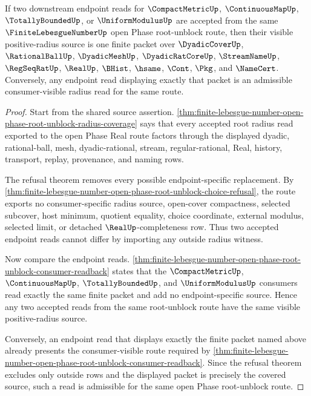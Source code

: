 \begin{theorem}
\label{thm:finite-lebesgue-number-root-unblock-endpoint-uniformity}
If two downstream endpoint reads for $\CompactMetricUp$, $\ContinuousMapUp$, $\TotallyBoundedUp$, or $\UniformModulusUp$ are accepted from the same $\FiniteLebesgueNumberUp$ open Phase root-unblock route, then their visible positive-radius source is one finite packet over $\DyadicCoverUp$, $\RationalBallUp$, $\DyadicMeshUp$, $\DyadicRatCoreUp$, $\StreamNameUp$, $\RegSeqRatUp$, $\RealUp$, $\BHist$, $\hsame$, $\Cont$, $\Pkg$, and $\NameCert$. Conversely, any endpoint read displaying exactly that packet is an admissible consumer-visible radius read for the same route.
\end{theorem}
\begin{proof}
Start from the shared source assertion. \autoref{thm:finite-lebesgue-number-open-phase-root-unblock-radius-coverage} says that every accepted root radius read exported to the open Phase Real route factors through the displayed dyadic, rational-ball, mesh, dyadic-rational, stream, regular-rational, Real, history, transport, replay, provenance, and naming rows.

The refusal theorem removes every possible endpoint-specific replacement. By \autoref{thm:finite-lebesgue-number-open-phase-root-unblock-choice-refusal}, the route exports no consumer-specific radius source, open-cover compactness, selected subcover, host minimum, quotient equality, choice coordinate, external modulus, selected limit, or detached $\RealUp$-completeness row. Thus two accepted endpoint reads cannot differ by importing any outside radius witness.

Now compare the endpoint reads. \autoref{thm:finite-lebesgue-number-open-phase-root-unblock-consumer-readback} states that the $\CompactMetricUp$, $\ContinuousMapUp$, $\TotallyBoundedUp$, and $\UniformModulusUp$ consumers read exactly the same finite packet and add no endpoint-specific source. Hence any two accepted reads from the same root-unblock route have the same visible positive-radius source.

Conversely, an endpoint read that displays exactly the finite packet named above already presents the consumer-visible route required by \autoref{thm:finite-lebesgue-number-open-phase-root-unblock-consumer-readback}. Since the refusal theorem excludes only outside rows and the displayed packet is precisely the covered source, such a read is admissible for the same open Phase root-unblock route.
\end{proof}

